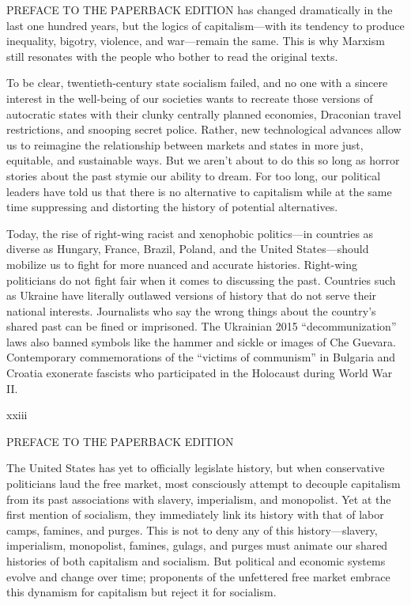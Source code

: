  \par 
PREFACE TO THE PAPERBACK EDITION has changed dramatically in the last one hundred years, but the logics of capitalism—with its tendency to produce inequality, bigotry, violence, and war—remain the same. This is why Marxism still resonates with the people who bother to read the original texts.
 \par 
To be clear, twentieth-century state socialism failed, and no one with a sincere interest in the well-being of our societies wants to recreate those versions of autocratic states with their clunky centrally planned economies, Draconian travel restrictions, and snooping secret police. Rather, new technological advances allow us to reimagine the relationship between markets and states in more just, equitable, and sustainable ways. But we aren't about to do this so long as horror stories about the past stymie our ability to dream. For too long, our political leaders have told us that there is no alternative to capitalism while at the same time suppressing and distorting the history of potential alternatives.
 \par 
Today, the rise of right-wing racist and xenophobic politics—in countries as diverse as Hungary, France, Brazil, Poland, and the United States—should mobilize us to fight for more nuanced and accurate histories. Right-wing politicians do not fight fair when it comes to discussing the past. Countries such as Ukraine have literally outlawed versions of history that do not serve their national interests. Journalists who say the wrong things about the country’s shared past can be fined or imprisoned. The Ukrainian 2015 “decommunization” laws also banned symbols like the hammer and sickle or images of Che Guevara. Contemporary commemorations of the “victims of communism” in Bulgaria and Croatia exonerate fascists who participated in the Holocaust during World War II.
 \par 
xxiii
 \par 
PREFACE TO THE PAPERBACK EDITION
 \par 
The United States has yet to officially legislate history, but when conservative politicians laud the free market, most consciously attempt to decouple capitalism from its past associations with slavery, imperialism, and monopolist. Yet at the first mention of socialism, they immediately link its history with that of labor camps, famines, and purges. This is not to deny any of this history—slavery, imperialism, monopolist, famines, gulags, and purges must animate our shared histories of both capitalism and socialism. But political and economic systems evolve and change over time; proponents of the unfettered free market embrace this dynamism for capitalism but reject it for socialism.
